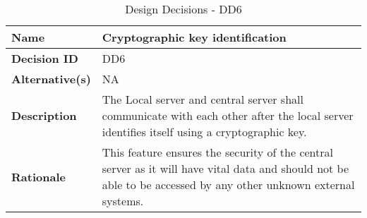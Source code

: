 \begin{table}[H]
	\centering
	\begin{tabularx}{\linewidth}{l|X}
		\textbf{Name}      & Cryptographic key identification \\ \hline
		\textbf{Decision ID}  & DD6 \\ \hline
		\textbf{Alternative(s)}     &  NA \\ \hline
		\textbf{Description}   & The Local server and central server shall communicate with each other after the local server identifies itself using a cryptographic key.\\ \hline
		\textbf{Rationale}    & This feature ensures the security of the central server as it will have vital data and should not be able to be accessed by any other unknown external systems. \\ \hline
	\end{tabularx}
	\caption{Design Decisions - DD6}
	\label{tbl:DD6}
\end{table}